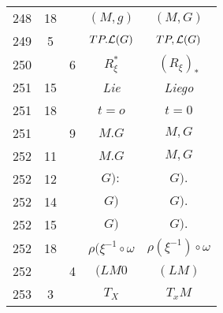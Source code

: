 \documentclass[a4paper,11pt]{article}
\begin{document}
\begin{center}
\begin{tabular}{|c|c|c|c|c|}
    248 & 18 & & $( M, g )$ & $( M, G )$ \\
    249 &  5 & & $TP.\mathcal{L}( G )$ & $TP, \mathcal{L}( G )$ \\
    250 & &  6 & $R_{ \xi }^{ * }$ & $( R_{ \xi } )_{ * }$ \\
    251 & 15 & & \textit{Lie} & \textit{Liego} \\
    251 & 18 & & $t = o$ & $t = 0$ \\
    251 & &  9 & $M.G$ & $M, G$ \\
    252 & 11 & & $M.G$ & $M, G$ \\
    252 & 12 & & $G):$ & $G).$ \\
    252 & 14 & & $G)$ & $G).$ \\
    252 & 15 & & $G)$ & $G).$ \\
    252 & 18 & & $\rho( \xi^{ -1 } \circ \omega$
           & $\rho( \xi^{ -1 } ) \circ \omega$ \\
    252 & &  4 & $( LM 0$ & $( LM )$ \\
    253 &  3 & & $T_{ X }$ & $T_{ x }M$ \\
    \hline
  \end{tabular}






\end{center}
\end{document}
